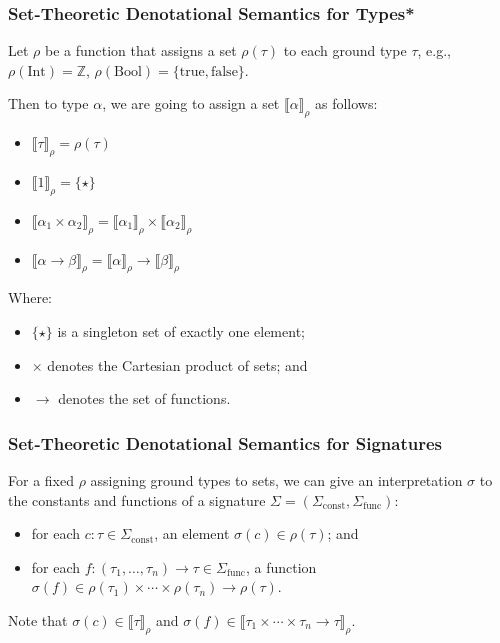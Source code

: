 \documentclass[aspectratio=169]{beamer}
\begin{document}
\begin{frame}
\frametitle{Set-Theoretic Denotational Semantics for Types*}

Let $\rho$ be a function that assigns a set $\rho(\tau)$ to each ground type $\tau$, e.g., $\rho(\text{Int}) = \mathbb{Z}$, $\rho(\text{Bool}) = \{ \text{true}, \text{false} \}$.

\pause
\medskip

Then to type $\alpha$, we are going to assign a set $\llbracket \alpha \rrbracket_{\rho}$ as follows:

\begin{itemize}
    \item $\llbracket \tau \rrbracket_{\rho} = \rho(\tau)$
    \item $\llbracket 1 \rrbracket_{\rho} = \{\star\}$
    \item $\llbracket \alpha_1 \times \alpha_2 \rrbracket_{\rho} = \llbracket \alpha_1 \rrbracket_{\rho} \times \llbracket \alpha_2 \rrbracket_{\rho}$
    \item $\llbracket \alpha \rightarrow \beta \rrbracket_{\rho} = \llbracket \alpha \rrbracket_{\rho} \rightarrow \llbracket \beta \rrbracket_{\rho}$
\end{itemize}

Where:
\begin{itemize}
    \item $\{\star\}$ is a singleton set of exactly one element;
    \item $\times$ denotes the Cartesian product of sets; and
    \item $\rightarrow$ denotes the set of functions.
\end{itemize}
\end{frame}

\begin{frame}
\frametitle{Set-Theoretic Denotational Semantics for Signatures}

For a fixed $\rho$ assigning ground types to sets, we can give an interpretation $\sigma$  to the constants and functions of a signature $\Sigma = (\Sigma_{\text{const}}, \Sigma_{\text{func}})$:
\begin{itemize}
    \item for each $c : \tau \in \Sigma_{\text{const}}$, an element $\sigma(c) \in \rho(\tau)$; and
    \item for each $f : (\tau_1, \ldots, \tau_n) \to \tau \in \Sigma_{\text{func}}$, a function $\sigma(f) \in \rho(\tau_1) \times \!\cdots\! \times \rho(\tau_n) \to \rho(\tau)$.
\end{itemize}
Note that $\sigma(c) \in \llbracket \tau \rrbracket_{\rho}$ and $\sigma(f) \in \llbracket \tau_1 \times \cdots \times \tau_n \rightarrow \tau \rrbracket_{\rho}$.
\end{frame}
\end{document}
